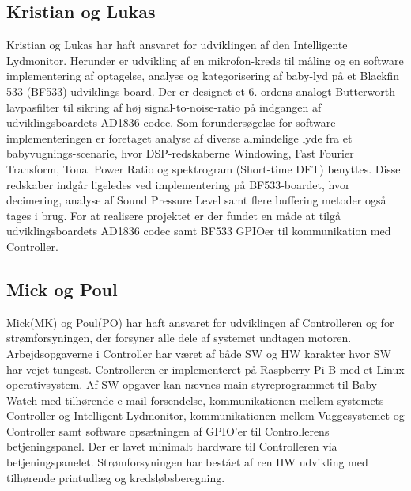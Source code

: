 \subsection*{Kristian og Lukas}
Kristian og Lukas har haft ansvaret for udviklingen af den Intelligente Lydmonitor. Herunder er udvikling af en mikrofon-kreds til måling  og en software implementering af optagelse, analyse og kategorisering af baby-lyd på et Blackfin 533 (BF533) udviklings-board. Der er designet et 6. ordens analogt Butterworth lavpasfilter til sikring af høj signal-to-noise-ratio på indgangen af udviklingsboardets AD1836 codec. Som forundersøgelse for software-implementeringen er foretaget analyse af diverse almindelige lyde fra et babyvugnings-scenarie, hvor DSP-redskaberne Windowing, Fast Fourier Transform, Tonal Power Ratio og spektrogram (Short-time DFT) benyttes. Disse redskaber indgår ligeledes ved implementering på BF533-boardet, hvor decimering, analyse af Sound Pressure Level samt flere buffering metoder også tages i brug. For at realisere projektet er der fundet en måde at tilgå udviklingsboardets AD1836 codec samt BF533 GPIOer til kommunikation med Controller.  \\

\subsection*{Mick og Poul}
Mick(MK) og Poul(PO) har haft ansvaret for udviklingen af Controlleren og for strømforsyningen, der forsyner alle dele af systemet undtagen motoren. Arbejdsopgaverne i Controller har været af både SW og HW karakter hvor SW har vejet tungest. Controlleren er implementeret på Raspberry Pi B med et Linux operativsystem. Af SW opgaver kan nævnes main styreprogrammet til Baby Watch med tilhørende e-mail forsendelse, kommunikationen mellem systemets Controller og Intelligent Lydmonitor, kommunikationen mellem Vuggesystemet og Controller samt software opsætningen af GPIO'er til Controllerens betjeningspanel. Der er lavet minimalt hardware til Controlleren via betjeningspanelet. Strømforsyningen har bestået af ren HW udvikling med tilhørende printudlæg og kredsløbsberegning.
